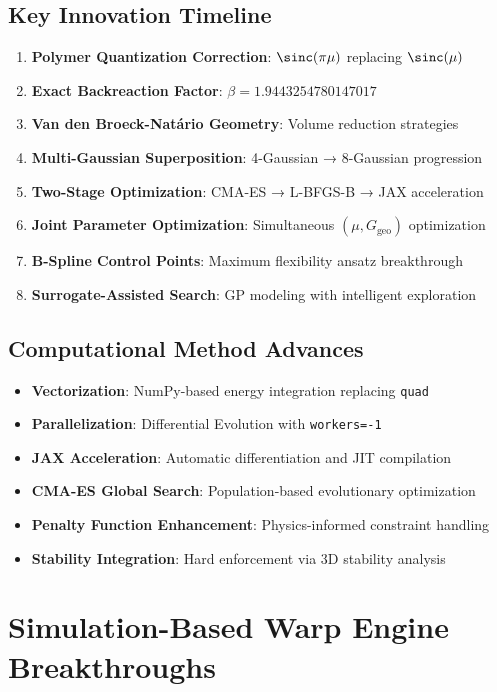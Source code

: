 \documentclass[11pt]{article}
\begin{document}
\subsection{Key Innovation Timeline}

\begin{enumerate}
\item \textbf{Polymer Quantization Correction}: $\sinc(\pi\mu)$ replacing $\sinc(\mu)$
\item \textbf{Exact Backreaction Factor}: $\beta = 1.9443254780147017$
\item \textbf{Van den Broeck-Natário Geometry}: Volume reduction strategies
\item \textbf{Multi-Gaussian Superposition}: 4-Gaussian → 8-Gaussian progression
\item \textbf{Two-Stage Optimization}: CMA-ES → L-BFGS-B → JAX acceleration
\item \textbf{Joint Parameter Optimization}: Simultaneous $(\mu, G_{\text{geo}})$ optimization
\item \textbf{B-Spline Control Points}: Maximum flexibility ansatz breakthrough
\item \textbf{Surrogate-Assisted Search}: GP modeling with intelligent exploration
\end{enumerate}

\subsection{Computational Method Advances}

\begin{itemize}
\item \textbf{Vectorization}: NumPy-based energy integration replacing \texttt{quad}
\item \textbf{Parallelization}: Differential Evolution with \texttt{workers=-1}
\item \textbf{JAX Acceleration}: Automatic differentiation and JIT compilation
\item \textbf{CMA-ES Global Search}: Population-based evolutionary optimization
\item \textbf{Penalty Function Enhancement}: Physics-informed constraint handling
\item \textbf{Stability Integration}: Hard enforcement via 3D stability analysis
\end{itemize}

\section{Simulation-Based Warp Engine Breakthroughs}
\end{document}
